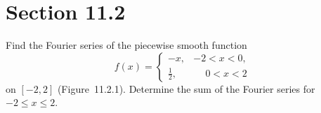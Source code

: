 \section*{Section 11.2}
\setcounter{chapter}{11}
\setcounter{section}{2}

\setcounter{example}{0}
\begin{example}
  \label{example:11.2.1} \rm Find the Fourier series of the piecewise smooth function
  \[
    f(x)= \left\{
    \begin{array}{rlr}
      -x,          & -2<x<0,          \\
      \frac{1}{2}, & \phantom{-}0<x<2
    \end{array}\right.
  \]
  on $[-2,2]$ (Figure~11.2.1). Determine the sum of the Fourier series for
  $-2\le x\le2$.
\end{example}
\setcounter{figure}{1}
